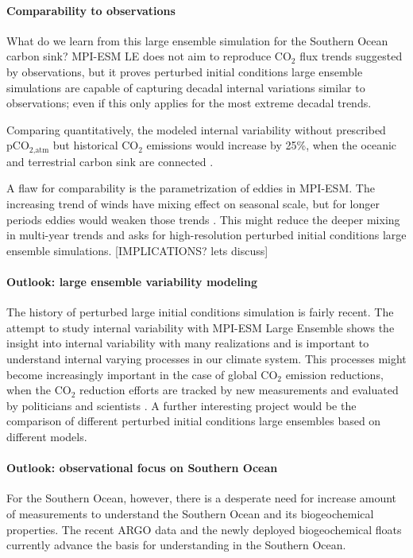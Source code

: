 \documentclass[12pt]{article}
\begin{document}
\paragraph{Comparability to observations}
What do we learn from this large ensemble simulation for the Southern Ocean carbon sink? MPI-ESM LE does not aim to reproduce CO$_2$ flux trends suggested by observations, but it proves perturbed initial conditions large ensemble simulations are capable of capturing decadal internal variations similar to observations; even if this only applies for the most extreme decadal trends.

Comparing quantitatively, the modeled internal variability without prescribed pCO$_{\text{2,atm}}$ but historical CO$_2$ emissions would increase by 25\%, when the oceanic and terrestrial carbon sink are connected \citep{Ilyina2013}.

A flaw for comparability is the parametrization of eddies in MPI-ESM. The increasing trend of winds have mixing effect on seasonal scale, but for longer periods eddies would weaken those trends \citep{Thompson2011}. This might reduce the deeper mixing in multi-year trends and asks for high-resolution perturbed initial conditions large ensemble simulations. [IMPLICATIONS? lets discuss]




\paragraph{Outlook: large ensemble variability modeling}
The history of perturbed large initial conditions simulation is fairly recent. The attempt to study internal variability with MPI-ESM Large Ensemble shows the insight into internal variability with many realizations and is important to understand internal varying processes in our climate system. This processes might become increasingly important in the case of global CO$_2$ emission reductions, when the CO$_2$ reduction efforts are tracked by new measurements and evaluated by politicians and scientists \citep{Hakwins2009,Lovenduski2015,Marotzke2017}. A further interesting project would be the comparison of different perturbed initial conditions large ensembles based on different models.

\paragraph{Outlook: observational focus on Southern Ocean} For the Southern Ocean, however, there is a desperate need for increase amount of measurements to understand the Southern Ocean and its biogeochemical properties. The recent ARGO data and the newly deployed biogeochemical floats currently advance the basis for understanding in the Southern Ocean.    
\end{document}
